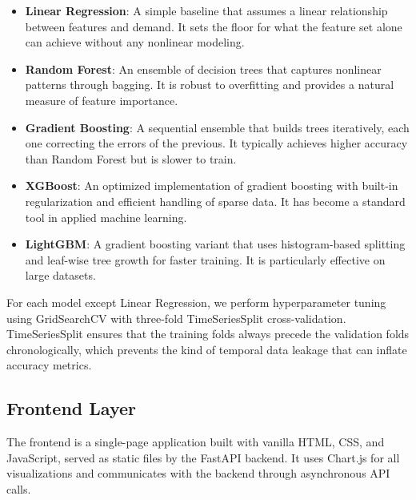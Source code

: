 \documentclass[conference]{IEEEtran}
\begin{document}
\begin{itemize}
    \item \textbf{Linear Regression}: A simple baseline that assumes a linear relationship between features and demand. It sets the floor for what the feature set alone can achieve without any nonlinear modeling.
    \item \textbf{Random Forest}: An ensemble of decision trees that captures nonlinear patterns through bagging. It is robust to overfitting and provides a natural measure of feature importance.
    \item \textbf{Gradient Boosting}: A sequential ensemble that builds trees iteratively, each one correcting the errors of the previous. It typically achieves higher accuracy than Random Forest but is slower to train.
    \item \textbf{XGBoost}: An optimized implementation of gradient boosting with built-in regularization and efficient handling of sparse data. It has become a standard tool in applied machine learning.
    \item \textbf{LightGBM}: A gradient boosting variant that uses histogram-based splitting and leaf-wise tree growth for faster training. It is particularly effective on large datasets.
\end{itemize}

For each model except Linear Regression, we perform hyperparameter tuning using GridSearchCV with three-fold TimeSeriesSplit cross-validation. TimeSeriesSplit ensures that the training folds always precede the validation folds chronologically, which prevents the kind of temporal data leakage that can inflate accuracy metrics.

\subsection{Frontend Layer}

The frontend is a single-page application built with vanilla HTML, CSS, and JavaScript, served as static files by the FastAPI backend. It uses Chart.js for all visualizations and communicates with the backend through asynchronous API calls.
\end{document}
